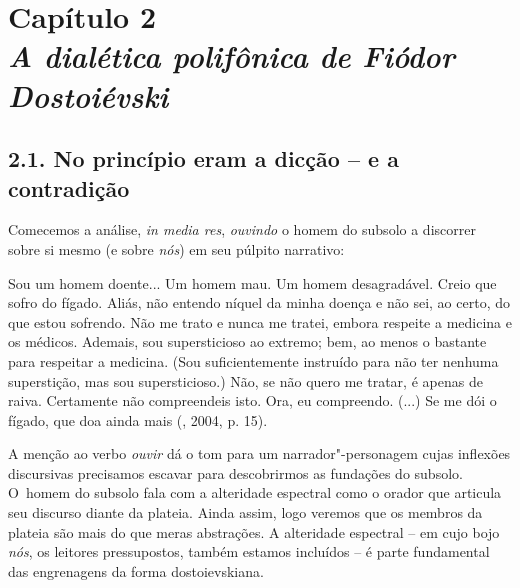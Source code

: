 {{\chapter*{Capítulo 2\\
\bigskip
\emph{A dialética polifônica de Fiódor Dostoiévski}}


\section{2.1. No princípio eram a dicção -- e a contradição}

Comecemos a análise, \emph{in media res}, \emph{ouvindo} o homem do
subsolo a discorrer sobre si mesmo (e sobre \emph{nós}) em seu púlpito
narrativo:

Sou um homem doente... Um homem mau. Um homem desagradável. Creio que
sofro do fígado. Aliás, não entendo níquel da minha doença e não sei, ao
certo, do que estou sofrendo. Não me trato e nunca me tratei, embora
respeite a medicina e os médicos. Ademais, sou supersticioso ao extremo;
bem, ao menos o bastante para respeitar a medicina. (Sou suficientemente
instruído para não ter nenhuma superstição, mas sou supersticioso.) Não,
se não quero me tratar, é apenas de raiva. Certamente não compreendeis
isto. Ora, eu compreendo. (...) Se me dói o fígado, que doa ainda mais
(, 2004, p. 15).

A menção ao verbo \emph{ouvir} dá o tom para um narrador"-personagem
cujas inflexões discursivas precisamos escavar para descobrirmos as
fundações do subsolo. O~homem do subsolo fala com a alteridade espectral
como o orador que articula seu discurso diante da plateia. Ainda assim,
logo veremos que os membros da plateia são mais do que meras abstrações.
A alteridade espectral -- em cujo bojo \emph{nós}, os leitores
pressupostos, também estamos incluídos -- é parte fundamental das
engrenagens da forma dostoievskiana.

}}
